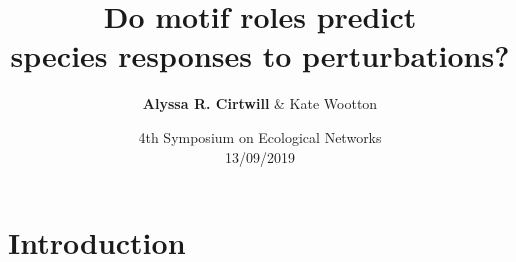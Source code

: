 \documentclass{beamer}
\title[Do motif roles predict species responses to perturbations?]
{Do motif roles predict\\ species responses to perturbations?}
\author[A.R. Cirtwill \& K. Wootton]{\textbf{Alyssa R. Cirtwill} \& Kate Wootton}
\date[Short Occasion]
{4th Symposium on Ecological Networks\\13/09/2019}
\begin{document}
\newcommand{\SubItem}[1]{
    {\setlength\itemindent{12pt} \item[*] #1}
}

\begin{frame}
  \titlepage
\end{frame}

\section*{Introduction} %


\end{document}
